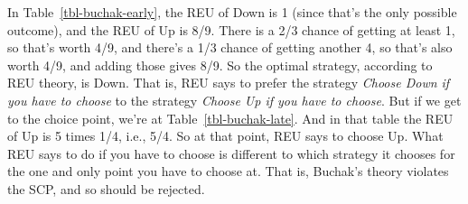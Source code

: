 \documentclass[
  10pt,
  letterpaper,
  DIV=11,
  numbers=noendperiod,
  twoside]{scrartcl}
\begin{document}
\begin{table}

\caption{\label{tbl-panel}Two strategy tables for
Figure~\ref{fig-buchak}.}

\begin{minipage}[t]{0.50\linewidth}



\end{minipage}%
%
\begin{minipage}[t]{0.50\linewidth}



\end{minipage}%

\end{table}%

In Table~\ref{tbl-buchak-early}, the REU of Down is 1 (since that's the
only possible outcome), and the REU of Up is 8/9. There is a 2/3 chance
of getting at least 1, so that's worth 4/9, and there's a 1/3 chance of
getting another 4, so that's also worth 4/9, and adding those gives 8/9.
So the optimal strategy, according to REU theory, is Down. That is, REU
says to prefer the strategy \emph{Choose Down if you have to choose} to
the strategy \emph{Choose Up if you have to choose}. But if we get to
the choice point, we're at Table~\ref{tbl-buchak-late}. And in that
table the REU of Up is 5 times 1/4, i.e., 5/4. So at that point, REU
says to choose Up. What REU says to do if you have to choose is
different to which strategy it chooses for the one and only point you
have to choose at. That is, Buchak's theory violates the SCP, and so
should be rejected.
\end{document}
